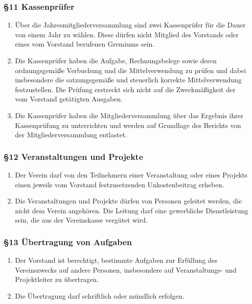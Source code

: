 \documentclass[german]{article}
\begin{document}
\subsubsection*{§11 Kassenprüfer}\label{kassenpruxfcfer}

\begin{enumerate}
\def\labelenumi{\arabic{enumi}.}
\item
  Über die Jahresmitgliederversammlung sind zwei Kassenprüfer für die
  Dauer von einem Jahr zu wählen. Diese dürfen nicht Mitglied des
  Vorstands oder eines vom Vorstand berufenen Gremiums sein.
\item
  Die Kassenprüfer haben die Aufgabe, Rechnungsbelege sowie deren
  ordnungsgemäße Verbuchung und die Mittelverwendung zu prüfen und dabei
  insbesondere die satzungsgemäße und steuerlich korrekte
  Mittelverwendung festzustellen. Die Prüfung erstreckt sich nicht auf
  die Zweckmäßigkeit der vom Vorstand getätigten Ausgaben.
\item
  Die Kassenprüfer haben die Mitgliederversammlung über das Ergebnis
  ihrer Kassenprüfung zu unterrichten und werden auf Grundlage des
  Berichts von der Mitgliederversammlung entlastet.
\end{enumerate}

\subsubsection*{§12 Veranstaltungen und
Projekte}\label{veranstaltungen-und-projekte}

\begin{enumerate}
\def\labelenumi{\arabic{enumi}.}
\item
  Der Verein darf von den Teilnehmern einer Veranstaltung oder eines
  Projekts einen jeweils vom Vorstand festzusetzenden Unkostenbeitrag
  erheben.
\item
  Die Veranstaltungen und Projekte dürfen von Personen geleitet werden,
  die nicht dem Verein angehören. Die Leitung darf eine gewerbliche
  Dienstleistung sein, die aus der Vereinskasse vergütet wird.
\end{enumerate}

\subsubsection*{§13 Übertragung von
Aufgaben}\label{uxfcbertragung-von-aufgaben}

\begin{enumerate}
\def\labelenumi{\arabic{enumi}.}
\item
  Der Vorstand ist berechtigt, bestimmte Aufgaben zur Erfüllung des
  Vereinszwecks auf andere Personen, insbesondere auf Veranstaltungs-
  und Projektleiter zu übertragen.
\item
  Die Übertragung darf schriftlich oder mündlich erfolgen.
\end{enumerate}
\end{document}
